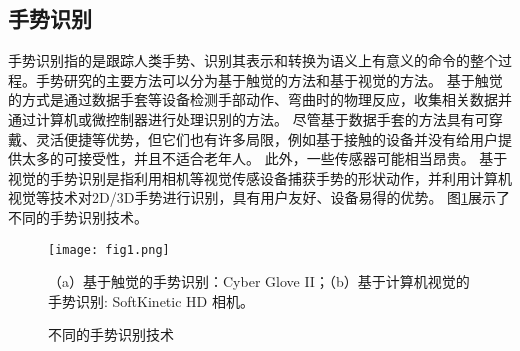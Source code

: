 \subsection{手势识别}
手势识别指的是跟踪人类手势、识别其表示和转换为语义上有意义的命令的整个过程\cite{rautaray2015vision}。手势研究的主要方法可以分为基于触觉的方法和基于视觉的方法\cite{oudah2020hand,rautaray2015vision}。
基于触觉的方式是通过数据手套等设备检测手部动作、弯曲时的物理反应，收集相关数据并通过计算机或微控制器进行处理识别的方法。
尽管基于数据手套的方法具有可穿戴、灵活便捷等优势，但它们也有许多局限，例如基于接触的设备并没有给用户提供太多的可接受性\cite{rautaray2015vision}，并且不适合老年人。%
此外，一些传感器可能相当昂贵\cite{oudah2020hand}。
基于视觉的手势识别是指利用相机等视觉传感设备捕获手势的形状动作，并利用计算机视觉等技术对2D/3D手势进行识别，具有用户友好、设备易得的优势。%
%
图\ref{fig:gesture_techniques}展示了不同的手势识别技术。
\begin{figure}
  \centering
  \texttt{[image: fig1.png]}
  \caption*{（a）基于触觉的手势识别：Cyber Glove II\cite{kevin2004}；（b）基于计算机视觉的手势识别: SoftKinetic HD 相机\cite{iisuSDK2012}。}
  \caption{不同的手势识别技术}
  \label{fig:gesture_techniques}
\end{figure}

